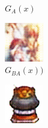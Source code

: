 \documentclass[twocolumn,11pt]{ctexart}
\begin{document}
\begin{figure}[htb]
\begin{subfigure}[b]{0.23\linewidth}
        \caption{$G_A(x)$}
      \end{subfigure}
      \begin{subfigure}[b]{0.23\linewidth}
        \includegraphics[width=\linewidth]{exp2_epoch004_rec_A.png}
        \caption{$G_{BA}(x))$}
      \end{subfigure}
      \begin{subfigure}[b]{0.23\linewidth}
        \includegraphics[width=\linewidth]{exp2_epoch004_idt_A.png}

\end{subfigure}
\end{figure}
\end{document}

